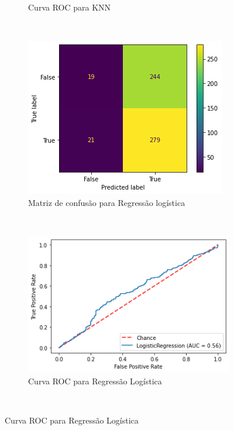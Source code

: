 \begin{figure}[htb]
\begin{subfigure}[b]{0.45\textwidth}
        \caption{Curva ROC para KNN}
        \label{fig:resultados:base-de-dados-28.3.6-roc-curve-knn-total-cnae}
    \end{subfigure} ~ \\
    \centering 
    \begin{subfigure}[b]{0.45\textwidth}
        \includegraphics[scale=0.45]{images/base-de-dados-28.4.7-confusion-matrix-logregression-total-cnae.png}
        \caption{Matriz de confusão para Regressão logística}
        \label{fig:resultados:base-de-dados-28.3.7-confusion-matrix-logregression-total-cnae}
    \end{subfigure} ~ \quad
    \begin{subfigure}[b]{0.45\textwidth}
        \includegraphics[scale=0.45]{images/base-de-dados-28.4.8-roc-curve-logregression-total-cnae.png}
        \caption{Curva ROC para Regressão Logística}
        \label{fig:resultados:base-de-dados-28.3.8-roc-curve-logregression-total-cnae}
    \end{subfigure} ~ \\
    \fdadospesquisa
\end{figure}
